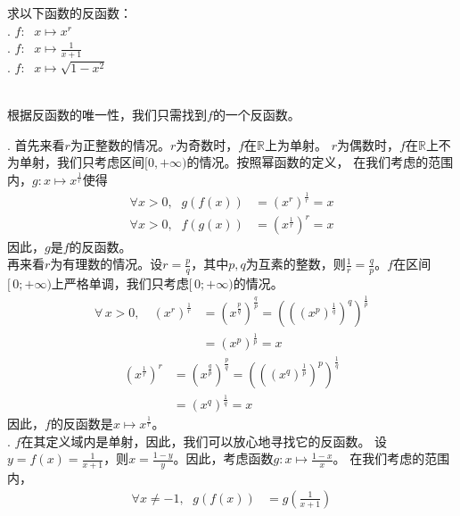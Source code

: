 \documentclass[12pt,UTF8,fontset=none]{ctexbook}
\begin{document}
\begin{et}\label{et:1-3-0}
    求以下函数的反函数：\\
    . $f:\;\,\,x \mapsto x^r$\\
    . $f:\;\,\,x \mapsto \frac{1}{x + 1}$\\
    . $f:\;\,\,x \mapsto \sqrt{1 - x^2}$
\end{et}
\begin{so}
    \mbox{} \\
    根据反函数的唯一性，我们只需找到$f$的一个反函数。

    . 首先来看$r$为正整数的情况。$r$为奇数时，$f$在$\mathbb{R}$上为单射。
    $r$为偶数时，$f$在$\mathbb{R}$上不为单射，我们只考虑区间$[0, +\infty)$的情况。按照幂函数的定义，
    在我们考虑的范围内，$g: x\mapsto x^{\frac{1}{r}}$使得
    \begin{align*}
        \forall x > 0, \;\,\, g(f(x)) &= \left(x^r\right)^{\frac{1}{r}} = x  \\
        \forall x > 0, \;\,\, f(g(x)) &= \left(x^{\frac{1}{r}}\right)^{r} = x  
    \end{align*} 
    因此，$g$是$f$的反函数。\\  
    再来看$r$为有理数的情况。设$r = \frac{p}{q}$，其中$p,q$为互素的整数，则$\frac{1}{r} = \frac{q}{p}$。$f$在区间$[\,0;+\infty)$上严格单调，我们只考虑$[\,0;+\infty)$的情况。
    \begin{align*}
        \forall \, x > 0, \quad \left(x^r\right)^{\frac{1}{r}} &= \left(x^{\frac{p}{q}}\right)^{\frac{q}{p}} = \left(\left(\left(x^{p}\right)^\frac{1}{q}\right)^q\right)^\frac{1}{p}  \\
                                       &= \left(x^{p}\right)^\frac{1}{p} = x 
    \end{align*}
    \begin{align*}
        \left(x^{\frac{1}{r}}\right)^r &= \left(x^{\frac{q}{p}}\right)^{\frac{p}{q}} = \left(\left(\left(x^{q}\right)^\frac{1}{p}\right)^p\right)^\frac{1}{q}  \\
                                       &= \left(x^{q}\right)^\frac{1}{q} = x 
    \end{align*}
    因此，$f$的反函数是$x\mapsto x^{\frac{1}{r}}$。\\
    . $f$在其定义域内是单射，因此，我们可以放心地寻找它的反函数。
    设$y = f(x) = \frac{1}{x+1}$，则$x = \frac{1 - y}{y}$。因此，考虑函数$g: x\mapsto \frac{1 - x}{x}$。
    在我们考虑的范围内，
    \begin{align*}
        \forall x\neq -1, \;\,\, g(f(x)) &= g\left(\frac{1}{x+1}\right)  \\

\end{align*}
\end{so}
\end{document}
